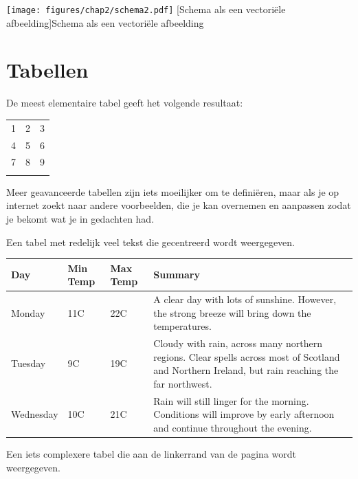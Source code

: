 \begin{center}
\texttt{[image: figures/chap2/schema2.pdf]}
[Schema als een vectori\"ele afbeelding]{Schema als een vectori\"ele afbeelding\label{fig_voorbeeld3}}
\end{center}

\section{Tabellen}

De meest elementaire tabel geeft het volgende resultaat:

\begin{tabular}{ l c r }
  1 & 2 & 3 \\
  4 & 5 & 6 \\
  7 & 8 & 9 \\
\label{eenvoudige tabel}
\end{tabular}

Meer geavanceerde tabellen zijn iets moeilijker om te defini\"eren, maar als je op internet zoekt naar andere voorbeelden, die je kan overnemen en aanpassen zodat je bekomt wat je in gedachten had.

Een tabel met redelijk veel tekst die gecentreerd wordt weergegeven.

\begin{center}
    \begin{tabular}{ | l | l | l | p{5cm} |}
    \hline
     Day         & Min Temp & Max Temp & Summary \\ \hline \hline
     Monday      & 11C      & 22C      & A clear day with lots of sunshine.  
     However, the strong breeze will bring down the temperatures. \\ \hline
     Tuesday     & 9C       & 19C      & Cloudy with rain, across many northern regions. Clear spells across most of Scotland and Northern Ireland, but rain reaching the far northwest. \\ \hline
     Wednesday   & 10C      & 21C      & Rain will still linger for the morning. Conditions will improve by early afternoon and continue throughout the evening. \\
    \hline
    \end{tabular}
\label{tb:Xname}
\end{center}

Een iets complexere tabel die aan de linkerrand van de pagina wordt weergegeven.

